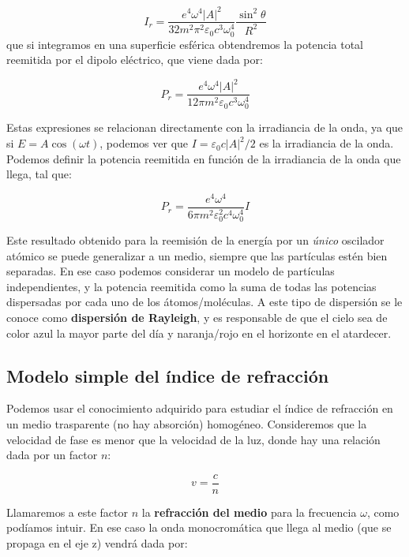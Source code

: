 \documentclass[12pt,a4paper]{article}
\numberwithin{equation}{section}
\numberwithin{figure}{section}
\begin{document}
\begin{equation}
I_r = \dfrac{e^4 \omega^4 |A|^2}{32 m^2 \pi^2 \varepsilon_0 c^3 \omega_0^4} \dfrac{\sin^2 \theta}{R^2}
\end{equation}
que si integramos en una superficie esférica obtendremos la potencia total reemitida por el dipolo eléctrico, que viene dada por:

\begin{equation}
P_r = \dfrac{e^4 \omega^4 |A|^2}{12 \pi m^2 \varepsilon_0	c^3 \omega_0^4}
\end{equation}

Estas expresiones se relacionan directamente con la irradiancia de la onda, ya que si $E=A \cos(\omega t)$, podemos ver que $I=\varepsilon_0 c |A|^2 / 2$ es la irradiancia de la onda. Podemos definir la potencia reemitida en función de la irradiancia de la onda que llega, tal que:

\begin{equation}
P_r = \dfrac{e^4 \omega^4}{6 \pi m^2 \varepsilon_0^2 c^4 \omega_0^4} I
\end{equation}

Este resultado obtenido para la reemisión de la energía por un \textit{único} oscilador atómico se puede generalizar a un medio, siempre que las partículas estén bien separadas. En ese caso podemos considerar un modelo de partículas independientes, y la potencia reemitida como la suma de todas las potencias dispersadas por cada uno de los átomos/moléculas. A este tipo de dispersión se le conoce como \textbf{dispersión de Rayleigh}, y es responsable de que el cielo sea de color azul la mayor parte del día y naranja/rojo en el horizonte en el atardecer. \\

\subsection{Modelo simple del índice de refracción}

Podemos usar el conocimiento adquirido para estudiar el índice de refracción en un medio trasparente (no hay absorción) homogéneo. Consideremos que la velocidad de fase es menor que la velocidad de la luz, donde hay una relación dada por un factor $n$:

\begin{equation}
v = \dfrac{c}{n}
\end{equation}

Llamaremos a este factor $n$ la \textbf{refracción del medio} para la frecuencia $ \omega$, como podíamos intuir. En ese caso la onda monocromática que llega al medio (que se propaga en el eje z) vendrá dada por:
\end{document}
